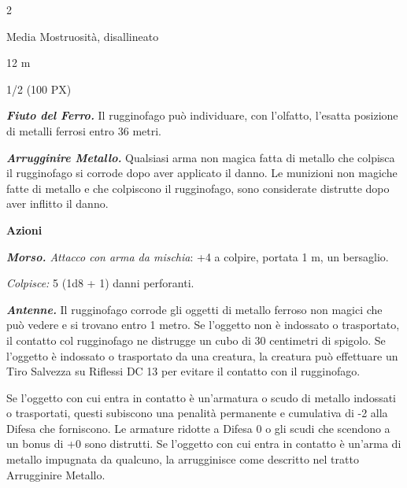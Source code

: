 \begin{multicols}{2}
{
\begin{description}[noitemsep, topsep=0pt, parsep=0pt, partopsep=0pt, itemsep=1pt, leftmargin=2.35cm,  labelwidth=2.2cm, itemindent=0cm, listparindent=0pt] %
\setlength{\baselineskip}{10pt}
\item[\textbf{Taglia/Tipo}] Media Mostruosità, disallineato
\item[\textbf{Caratt.}] 
\item[\textbf{Punti Ferita}] 
\item[\textbf{Movimento}] 12 m
\item[\textbf{Tiri Salvez.}] 
\item[\textbf{Sensi}] 
\item[\textbf{Sfida}] 1/2 (100 PX)
\end{description}
\smallskip

\emph{\textbf{Fiuto del Ferro.}} Il rugginofago può individuare, con l'olfatto, l'esatta posizione di metalli ferrosi entro 36 metri.

\emph{\textbf{Arrugginire Metallo.}} Qualsiasi arma non magica fatta di metallo che colpisca il rugginofago si corrode dopo aver applicato il danno. Le munizioni non magiche fatte di metallo e che colpiscono il rugginofago, sono considerate distrutte dopo aver inflitto il danno.

\textbf{Azioni}

\emph{\textbf{Morso.} Attacco con arma da mischia}: +4 a colpire, portata 1 m, un bersaglio.

\emph{Colpisce:} 5 (1d8 + 1) danni perforanti.

\emph{\textbf{Antenne.}} Il rugginofago corrode gli oggetti di metallo ferroso non magici che può vedere e si trovano entro 1 metro. Se l'oggetto non è indossato o trasportato, il contatto col rugginofago ne distrugge un cubo di 30 centimetri di spigolo. Se l'oggetto è indossato o trasportato da una creatura, la creatura può effettuare un Tiro Salvezza su Riflessi DC 13 per evitare il contatto con il rugginofago.

Se l'oggetto con cui entra in contatto è un'armatura o scudo di metallo indossati o trasportati, questi subiscono una penalità permanente e cumulativa di -2 alla Difesa che forniscono. Le armature ridotte a Difesa 0 o gli scudi che scendono a un bonus di +0 sono distrutti. Se l'oggetto con cui entra in contatto è un'arma di metallo impugnata da qualcuno, la arrugginisce come descritto nel tratto Arrugginire Metallo.

}
\end{multicols}
